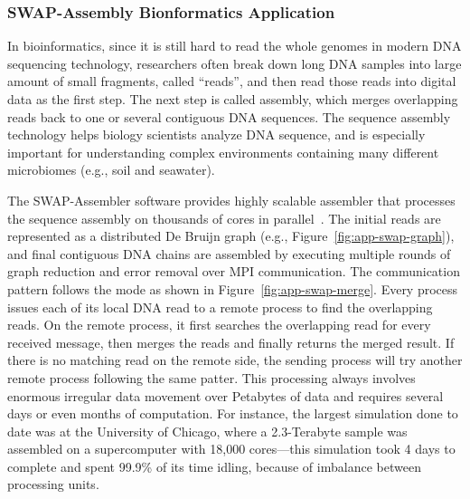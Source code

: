 \subsubsection{SWAP-Assembly Bionformatics Application}

In bioinformatics, since it is still hard to read the whole genomes
in modern DNA sequencing technology, researchers often break down long
DNA samples into large amount of small fragments, called ``reads'', and
then read those reads into digital data as the first step. The next step
is called assembly, which merges overlapping reads back to one or several
contiguous DNA sequences. The sequence assembly technology helps biology
scientists analyze DNA sequence, and is especially important for understanding
complex environments containing many different microbiomes (e.g., soil and
seawater).

The SWAP-Assembler software provides highly scalable assembler that processes
the sequence assembly on thousands of cores in parallel~\cite{swap}. The
initial reads are represented as a distributed De Bruijn graph (e.g.,
Figure~\ref{fig:app-swap-graph}), and final contiguous DNA chains are
assembled by executing multiple rounds of graph reduction and error removal
over MPI communication. The communication pattern follows the
 mode as shown in Figure~\ref{fig:app-swap-merge}.
Every process issues each of its local DNA read to a remote process to find
the overlapping reads. On the remote process, it first searches the
overlapping read for every received message, then merges the reads and
finally returns the merged result. If there is no matching read on the
remote side, the sending process will try another remote process following
the same patter. This processing always involves enormous irregular data
movement over Petabytes of data and requires several days or even months of
computation. For instance, the largest simulation done to date was at the
University of Chicago, where a 2.3-Terabyte sample was assembled on a
supercomputer with 18,000 cores—this simulation took 4 days to complete and
spent 99.9\% of its time idling, because of imbalance between processing
units.


